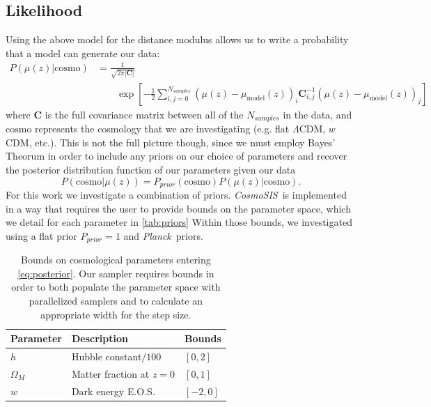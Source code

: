 \documentclass[12pt,a4paper]{article}
\newcommand\Planck{{\it Planck}\ }
\newcommand\CosmoSIS{{\it CosmoSIS}\ }
\begin{document}
\subsection{Likelihood}
\label{sec:likelihood}
Using the above model for the distance modulus allows us to write a
probability that a model can generate our data:
%
\begin{align}
  \label{eq:likelihood}
  P(\mu(z)|\mathrm{cosmo}) &= \frac{1}{\sqrt{2\pi|\mathbf{C}|}}\nonumber \\
  &\qquad{}\exp\left[-\frac{1}{2} \sum_{i,j=0}^{N_{samples}}\left(\mu(z) - \mu_{\mathrm{model}}(z)\right)_i 
    \mathbf{C}^{-1}_{i,j}\left(\mu(z) - \mu_{\mathrm{model}}(z)\right)_j\right]
\end{align}
%
where $\mathbf{C}$ is the full covariance matrix between all of the $N_{samples}$ 
in the data, and $\mathrm{cosmo}$ represents the cosmology that we are investigating
(e.g. flat $\Lambda$CDM, $w$CDM, etc.). 
This is not the full picture though, since we must employ
Bayes' Theorum in order to include any priors on our choice of 
parameters and recover the posterior distribution function of our
parameters given our data
%
\begin{equation}
  \label{eq:posterior}
  P(\mathrm{cosmo}|\mu(z)) = P_{prior}(\mathrm{cosmo}) P(\mu(z)|\mathrm{cosmo}).
\end{equation}
%
For this work we investigate a combination of priors. \CosmoSIS is implemented
in a way that requires the user to provide bounds on the parameter space, which we
detail for each parameter in \autoref{tab:priors}
Within those bounds, we investigated using a flat prior $P_{prior}=1$ and
\Planck priors.

\begin{table}
  \centering
  \caption{Bounds on cosmological parameters 
    entering \autoref{eq:posterior}. Our sampler requires
    bounds in order to both populate the parameter space with
    parallelized samplers and to calculate an appropriate width
    for the step size.}
  \label{tab:priors}
  \begin{tabular}{lll}
    Parameter & Description & Bounds \\ \hline
    $h$ & Hubble constant$/100$ & $[0,2]$ \\
    $\Omega_M$ & Matter fraction at $z=0$ & $[0,1]$ \\
    $w$ & Dark energy E.O.S. & $[-2,0]$\\
  \end{tabular}
\end{table}
\end{document}
